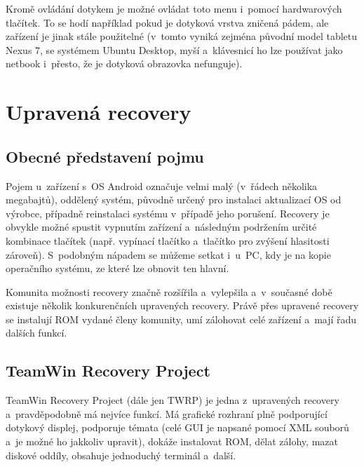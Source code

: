 \documentclass[12pt, a4paper, oneside]{article}
\begin{document}
Kromě ovládání dotykem je možné ovládat toto menu i~pomocí hardwarových tlačítek. To se hodí například pokud je dotyková vrstva zničená pádem, ale zařízení je jinak stále použitelné (v~tomto vyniká zejména původní model tabletu Nexus 7, se systémem Ubuntu Desktop, myší a~klávesnicí ho lze používat jako netbook i~přesto, že je dotyková obrazovka nefunguje).

\newpage
\section{Upravená recovery}
\label{recovery}
\subsection{Obecné představení pojmu}
Pojem  u~zařízení s~OS Android označuje velmi malý (v~řádech několika megabajtů), oddělený systém, původně určený pro instalaci aktualizací OS od výrobce, případně reinstalaci systému v~případě jeho porušení. Recovery je obvykle možné spustit vypnutím zařízení a~následným podržením určité kombinace tlačítek (např. vypínací tlačítko a~tlačítko pro zvýšení hlasitosti zároveň). S~podobným nápadem se můžeme setkat i~u~PC, kdy je na  kopie operačního systému, ze které lze obnovit ten hlavní.

Komunita možnosti recovery značně rozšířila a~vylepšila a~v~současné době existuje několik konkurenčních upravených recovery. Právě přes upravené recovery se instalují ROM vydané členy komunity, umí zálohovat celé zařízení a~mají řadu dalších funkcí.

\newpage
\subsection{TeamWin Recovery Project}
TeamWin Recovery Project\cite{twrp} (dále jen TWRP) je jedna z~upravených recovery a~pravděpodobně má nejvíce funkcí. Má grafické rozhraní plně podporující dotykový displej, podporuje témata (celé GUI je napsané pomocí XML souborů a~je možné ho jakkoliv upravit), dokáže instalovat ROM, dělat zálohy, mazat diskové oddíly, obsahuje jednoduchý terminál a~další.
\end{document}
